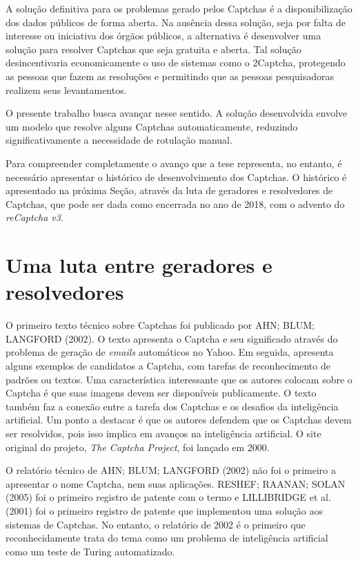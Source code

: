 \documentclass[12pt,twoside,brazilian]{book}
\begin{document}
A solução definitiva para os problemas gerado pelos Captchas é a
disponibilização dos dados públicos de forma aberta. Na ausência dessa
solução, seja por falta de interesse ou iniciativa dos órgãos públicos,
a alternativa é desenvolver uma solução para resolver Captchas que seja
gratuita e aberta. Tal solução desincentivaria economicamente o uso de
sistemas como o 2Captcha, protegendo as pessoas que fazem as resoluções
e permitindo que as pessoas pesquisadoras realizem seus levantamentos.

O presente trabalho busca avançar nesse sentido. A solução desenvolvida
envolve um modelo que resolve alguns Captchas automaticamente, reduzindo
significativamente a necessidade de rotulação manual.

Para compreender completamente o avanço que a tese representa, no
entanto, é necessário apresentar o histórico de desenvolvimento dos
Captchas. O histórico é apresentado na próxima Seção, através da luta de
geradores e resolvedores de Captchas, que pode ser dada como encerrada
no ano de 2018, com o advento do \emph{reCaptcha v3}.

\hypertarget{sec-historia}{%
\section{Uma luta entre geradores e resolvedores}\label{sec-historia}}

O primeiro texto técnico sobre Captchas foi publicado por AHN; BLUM;
LANGFORD (2002). O texto apresenta o Captcha e seu significado através
do problema de geração de \emph{emails} automáticos no Yahoo. Em
seguida, apresenta alguns exemplos de candidatos a Captcha, com tarefas
de reconhecimento de padrões ou textos. Uma característica interessante
que os autores colocam sobre o Captcha é que suas imagens devem ser
disponíveis publicamente. O texto também faz a conexão entre a tarefa
dos Captchas e os desafios da inteligência artificial. Um ponto a
destacar é que os autores defendem que os Captchas devem ser resolvidos,
pois isso implica em avanços na inteligência artificial. O site original
do projeto, \emph{The Captcha Project}, foi lançado em 2000.

O relatório técnico de AHN; BLUM; LANGFORD (2002) não foi o primeiro a
apresentar o nome Captcha, nem suas aplicações. RESHEF; RAANAN; SOLAN
(2005) foi o primeiro registro de patente com o termo e LILLIBRIDGE et
al. (2001) foi o primeiro registro de patente que implementou uma
solução aos sistemas de Captchas. No entanto, o relatório de 2002 é o
primeiro que reconhecidamente trata do tema como um problema de
inteligência artificial como um teste de Turing automatizado.
\end{document}
